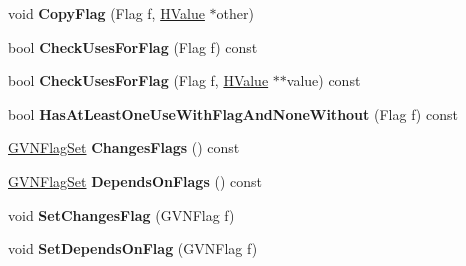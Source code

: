 \begin{DoxyCompactItemize}
\item 
\hypertarget{classv8_1_1internal_1_1_h_value_a757b5f5801a6aa346e3427e2f3bda83f}{}void {\bfseries Copy\+Flag} (Flag f, \hyperlink{classv8_1_1internal_1_1_h_value}{H\+Value} $\ast$other)\label{classv8_1_1internal_1_1_h_value_a757b5f5801a6aa346e3427e2f3bda83f}

\item 
\hypertarget{classv8_1_1internal_1_1_h_value_a5354d77b3f1e58c8343fade63c628560}{}bool {\bfseries Check\+Uses\+For\+Flag} (Flag f) const \label{classv8_1_1internal_1_1_h_value_a5354d77b3f1e58c8343fade63c628560}

\item 
\hypertarget{classv8_1_1internal_1_1_h_value_a2d8c9f81670f39de49a5648804a0fed9}{}bool {\bfseries Check\+Uses\+For\+Flag} (Flag f, \hyperlink{classv8_1_1internal_1_1_h_value}{H\+Value} $\ast$$\ast$value) const \label{classv8_1_1internal_1_1_h_value_a2d8c9f81670f39de49a5648804a0fed9}

\item 
\hypertarget{classv8_1_1internal_1_1_h_value_ab00d27f5b0a7c4bd4d5afead95d72a7c}{}bool {\bfseries Has\+At\+Least\+One\+Use\+With\+Flag\+And\+None\+Without} (Flag f) const \label{classv8_1_1internal_1_1_h_value_ab00d27f5b0a7c4bd4d5afead95d72a7c}

\item 
\hypertarget{classv8_1_1internal_1_1_h_value_a684ce4b2cfe10ce46a1e9448b1910df6}{}\hyperlink{classv8_1_1internal_1_1_enum_set}{G\+V\+N\+Flag\+Set} {\bfseries Changes\+Flags} () const \label{classv8_1_1internal_1_1_h_value_a684ce4b2cfe10ce46a1e9448b1910df6}

\item 
\hypertarget{classv8_1_1internal_1_1_h_value_a09d654cd1140b559e210ece25be857f0}{}\hyperlink{classv8_1_1internal_1_1_enum_set}{G\+V\+N\+Flag\+Set} {\bfseries Depends\+On\+Flags} () const \label{classv8_1_1internal_1_1_h_value_a09d654cd1140b559e210ece25be857f0}

\item 
\hypertarget{classv8_1_1internal_1_1_h_value_a0f836c72d478f9036cc77f53a0b61758}{}void {\bfseries Set\+Changes\+Flag} (G\+V\+N\+Flag f)\label{classv8_1_1internal_1_1_h_value_a0f836c72d478f9036cc77f53a0b61758}

\item 
\hypertarget{classv8_1_1internal_1_1_h_value_aeb16dbd964c886fc3864d6d8f15c8068}{}void {\bfseries Set\+Depends\+On\+Flag} (G\+V\+N\+Flag f)\label{classv8_1_1internal_1_1_h_value_aeb16dbd964c886fc3864d6d8f15c8068}


\end{DoxyCompactItemize}
